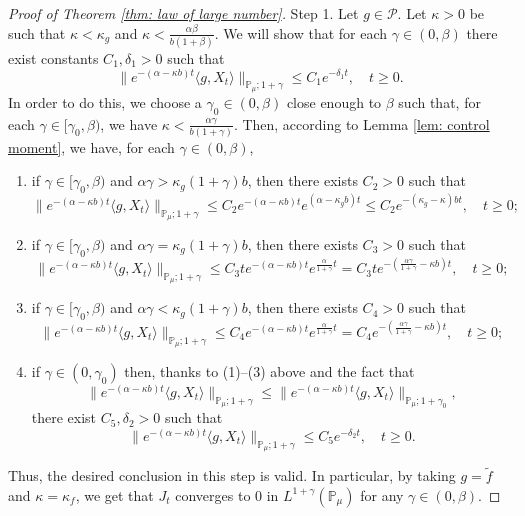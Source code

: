 \documentclass[12pt,a4paper]{amsart}
\theoremstyle{plain}
\theoremstyle{definition}
\numberwithin{equation}{section}
\begin{document}
\begin{proof}[Proof of Theorem \ref{thm: law of large number}]
	Step 1. Let $g\in \mathcal P$.
	Let $\kappa > 0$ be such that $\kappa < \kappa_g$ and $\kappa < \frac{\alpha \beta}{b(1+\beta)}$.
	We will show that for each $\gamma \in (0,\beta)$ there exist
	constants $C_1,\delta_1 > 0$ such that
\[
	\|e^{-(\alpha - \kappa b)t} \langle g, X_t\rangle\|_{\mathbb P_\mu;1+\gamma}
	\leq C_1 e^{-\delta_1 t},
	\quad t\geq 0.
\]
	In order to do this, we choose a $\gamma_0 \in (0,\beta)$ close enough to $\beta$ such that, for each $\gamma \in [\gamma_0, \beta)$, we have $\kappa < \frac{\alpha\gamma}{b(1+\gamma)}$.
	Then, according to Lemma \ref{lem: control moment}, we have, for each $\gamma \in (0,\beta)$,
\begin{enumerate}
\item
	if $\gamma \in [\gamma_0, \beta)$ and $\alpha\gamma> \kappa_g (1+\gamma)b$, then there exists $C_2>0$ such that
\[
    \|e^{-(\alpha - \kappa b)t} \langle g, X_t\rangle\|_{\mathbb P_\mu;1+\gamma}
    \leq C_2 e^{-(\alpha-\kappa b)t}e^{(\alpha-\kappa_g b)t}
    \leq C_2  e^{-(\kappa_g - \kappa )bt},
    \quad t\geq 0;
\]
\item
	if $\gamma \in [\gamma_0, \beta)$ and $\alpha\gamma=\kappa_g(1+\gamma)b$, then there exists $C_3>0$ such that
\[
    \|e^{-(\alpha - \kappa b)t} \langle g, X_t\rangle\|_{\mathbb P_\mu;1+\gamma}
    \leq C_3 t e^{-(\alpha - \kappa b)t}e^{\frac{\alpha}{1+\gamma}t}
    = C_3 t e^{-(\frac{\alpha \gamma}{1+\gamma} - \kappa b)t},
    \quad t\geq 0;
\]
\item
	if $\gamma \in [\gamma_0, \beta)$ and $\alpha\gamma < \kappa_g (1+\gamma)b$, then there exists $C_4>0$ such that
\[
    \|e^{-(\alpha - \kappa b)t} \langle g, X_t\rangle\|_{\mathbb{P}_{\mu};1+\gamma}
    \leq C_4  e^{-(\alpha - \kappa b)t}e^{\frac{\alpha}{1+\gamma}t}
    = C_4  e^{-(\frac{\alpha \gamma}{1+\gamma} - \kappa b)t},
    \quad t\geq 0;
\]
\item
	if $\gamma \in (0,\gamma_0)$ then, thanks to (1)--(3) above and the fact that \[\|e^{-(\alpha - \kappa b)t} \langle g, X_t\rangle\|_{\mathbb{P}_{\mu};1+\gamma}
	\leq \|e^{-(\alpha - \kappa b)t} \langle g, X_t\rangle\|_{\mathbb{P}_{\mu};1+\gamma_0},\] there exist $C_5, \delta_2 >0$ such that
\[
	\|e^{-(\alpha - \kappa b)t} \langle g, X_t\rangle\|_{\mathbb{P}_{\mu};1+\gamma}
	\leq C_5e^{-\delta_2 t},
	\quad t\geq 0.
\]
\end{enumerate}
	Thus, the desired conclusion in this step is valid.
	In particular, by taking $g = \widetilde f$ and $\kappa = \kappa_f$, we get that $J_t$ converges to $0$ in $L^{1+\gamma}(\mathbb{P}_{\mu})$ for any $\gamma\in(0,\beta)$.


\end{proof}
\end{document}
